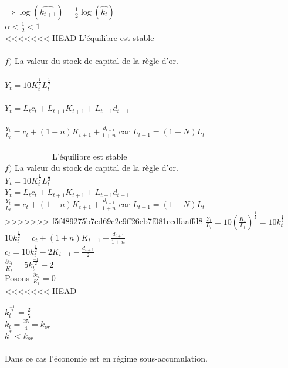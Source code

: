 \documentclass[11pt,twoside,a4paper]{article}
\begin{document}
$
\Rightarrow \log{(\widehat{k_{t+1}})}=\frac{1}{2}\log{(\widehat{k_{t}})}$\\

$
 \alpha <\frac{1}{2}<1$\\
<<<<<<< HEAD
 L'équilibre est stable\\\\
 $ f)$ La valeur du stock de capital de la règle d'or.\\\\
 $Y_t=10K_t^{\frac{1}{2}}L_t^{\frac{1}{2}}$\\\\
 $Y_t=L_tc_t+L_{t+1}K_{t+1}+L_{t-1}d_{t+1}$\\\\
 $\frac{Y_t}{L_t}=c_t+(1+n)K_{t+1}+\frac{d_{t+1}}{1+n}$\: car $L_{t+1}=(1+N)L_t$\\\\     
=======
 L'équilibre est stable\\
 
 $ f)$ La valeur du stock de capital de la règle d'or.\\
 $Y_t=10K_t^{\frac{1}{2}}L_t^{\frac{1}{2}}$\\
 $Y_t=L_tc_t+L_{t+1}K_{t+1}+L_{t-1}d_{t+1}$\\
 $\frac{Y_t}{L_t}=c_t+(1+n)K_{t+1}+\frac{d_{t+1}}{1+n}$\: car $L_{t+1}=(1+N)L_t$\\
>>>>>>> f5f489275b7ed69c2e9ff26eb7f081eedfaaffd8
$ \frac{Y_t}{L_t}=10(\frac{K_t}{L_t})^{\frac{1}{2}}=10k_t^{\frac{1}{2}}$\\

$ 10k_t^{\frac{1}{2}}=c_t+(1+n)K_{t+1}+\frac{d_{t+1}}{1+n}$\\
 
 $ c_t=10k_t^{\frac{1}{2}}-2K_{t+1}-\frac{d_{t+1}}{2}$\\
 
 $\frac{\partial c_t}{K_t}=5k_t^\frac{-1}{2}-2$\\
 
  Posons $\frac{\partial c_t}{K_t}=0$\\
<<<<<<< HEAD
  
  $k_t^\frac{-1}{2}=\frac{2}{5}$\\
  
  $k_t=\frac{25}{4}=k_{or}$\\

  $k^*<k_{or}$\\\\
  Dans ce cas l'économie est en régime sous-accumulation.\\
  
\end{document}
